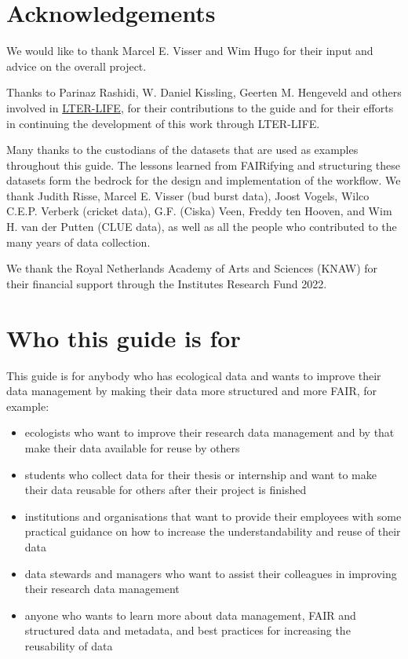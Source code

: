 \documentclass[
  oneside]{book}
\begin{document}
\section*{Acknowledgements}\label{acknowledgements}

We would like to thank Marcel E. Visser and Wim Hugo for their input and advice on the overall project.

Thanks to Parinaz Rashidi, W. Daniel Kissling, Geerten M. Hengeveld and others involved in \href{https://lter-life.nl/en}{LTER-LIFE}, for their contributions to the guide and for their efforts in continuing the development of this work through LTER-LIFE.

Many thanks to the custodians of the datasets that are used as examples throughout this guide. The lessons learned from FAIRifying and structuring these datasets form the bedrock for the design and implementation of the workflow. We thank Judith Risse, Marcel E. Visser (bud burst data), Joost Vogels, Wilco C.E.P. Verberk (cricket data), G.F. (Ciska) Veen, Freddy ten Hooven, and Wim H. van der Putten (CLUE data), as well as all the people who contributed to the many years of data collection.

We thank the Royal Netherlands Academy of Arts and Sciences (KNAW) for their financial support through the Institutes Research Fund 2022.

\section*{Who this guide is for}\label{who-this-guide-is-for}

This guide is for anybody who has ecological data and wants to improve their data management by making their data more structured and more FAIR, for example:

\begin{itemize}
\item
  ecologists who want to improve their research data management and by that make their data available for reuse by others
\item
  students who collect data for their thesis or internship and want to make their data reusable for others after their project is finished
\item
  institutions and organisations that want to provide their employees with some practical guidance on how to increase the understandability and reuse of their data
\item
  data stewards and managers who want to assist their colleagues in improving their research data management
\item
  anyone who wants to learn more about data management, FAIR and structured data and metadata, and best practices for increasing the reusability of data
\end{itemize}
\end{document}
